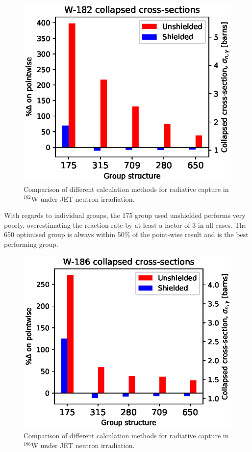 \begin{figure}[H]
  \centering
  \includegraphics[width=\linewidth]{W-182.eps}
  \caption{Comparison of different calculation methods for radiative capture in $^{182}$W under JET neutron irradiation.}
  \label{fig:tungsten-182}
\end{figure}

With regards to individual groups, the 175 group used unshielded performs very poorly, overestimating the reaction rate by at least a factor of 3 in all cases. The 650 optimised group is always within 50\% of the point-wise result and is the best performing group.

\begin{figure}[H]
  \centering
  \includegraphics[width=\linewidth]{W-186.eps}
  \caption{Comparison of different calculation methods for radiative capture in $^{186}$W under JET neutron irradiation.}
  \label{fig:tungsten-186}
\end{figure}

